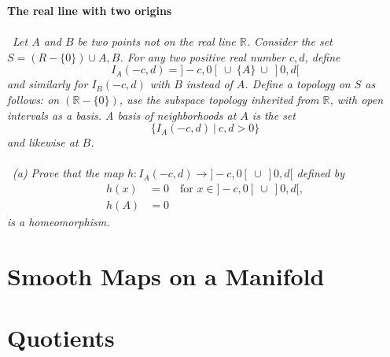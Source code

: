 \documentclass[12 pt]{article}
\newcommand{\R}{\mathbb{R}}
\numberwithin{equation}{section}
\begin{document}
\textbf{The real line with two origins}\\
\\
\
\textit{Let $A$ and $B$ be two points not on the real line $\R$. Consider the set $S = (R - \{0\}) \cup {A, B}$. For any two positive real number $c, d$, define} \begin{equation*}
I_A(-c, d) = ] -c, 0[ \ \cup \ \{A\} \ \cup \ ]0, d[
\end{equation*}
\textit{and similarly for $I_B(-c, d)$ with $B$ instead of $A$. Define a topology on $S$ as follows: on $(\R - \{0\})$, use the subspace topology inherited from $\R$, with open intervals as a basis. A basis of neighborhoods at $A$ is the set} \begin{equation*}
\{I_A (-c, d) \ | \ c, d > 0 \}
\end{equation*}
\textit{and likewise at $B$.}\\
\\
\
\textit{(a) Prove that the map $h: I_A (-c, d) \to ]-c, 0[ \ \cup \ ]0, d[$ defined by} \begin{align*}
h(x) & = 0 \ \ \ \mbox{ for } x \in ]-c, 0[ \ \cup \ ]0, d[, \\
h(A) & = 0
\end{align*}
\textit{is a homeomorphism.}
\

\section{Smooth Maps on a Manifold}

\section{Quotients}
\end{document}
